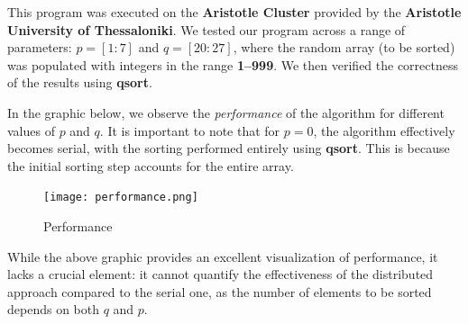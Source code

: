 \documentclass[12pt]{report}
\begin{document}
\begin{center}
\end{center}

This program was executed on the \textbf{Aristotle Cluster} provided by the \textbf{Aristotle University of Thessaloniki}. We tested our program across a range of parameters: $p = [1:7]$ and $q = [20:27]$, where the random array (to be sorted) was populated with integers in the range \textbf{1–999}. We then verified the correctness of the results using \textbf{qsort}. \newpage

In the graphic below, we observe the \textit{performance} of the algorithm for different values of $p$ and $q$. It is important to note that for $p=0$, the algorithm effectively becomes serial, with the sorting performed entirely using \textbf{qsort}. This is because the initial sorting step accounts for the entire array.

\begin{figure}[H]
    \centering
    \texttt{[image: performance.png]}
    \caption{Performance}
    \label{fig:enter-label}
\end{figure}

While the above graphic provides an excellent visualization of performance, it lacks a crucial element: it cannot quantify the effectiveness of the distributed approach compared to the serial one, as the number of elements to be sorted depends on both $q$ and $p$.
\end{document}
